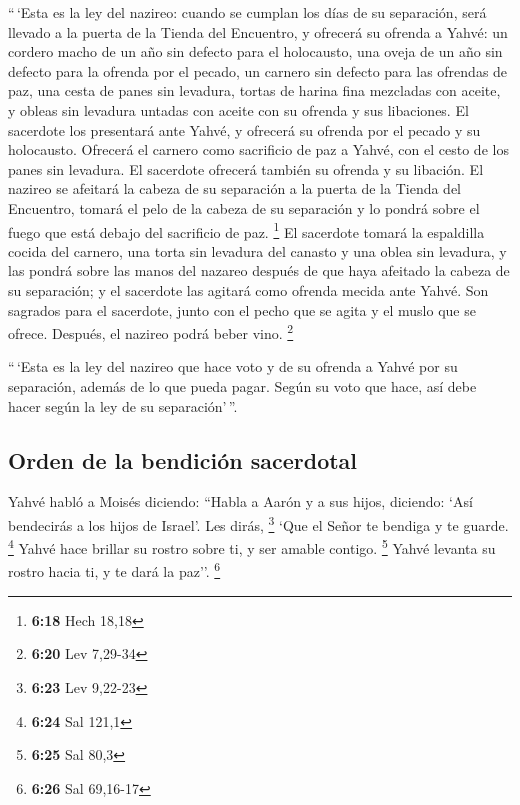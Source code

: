 \begin{paracol}{2}
 ``\,`Esta es la ley del nazireo: cuando se cumplan los
días de su separación, será llevado a la puerta de la Tienda del
Encuentro,  y ofrecerá su ofrenda a Yahvé: un cordero
macho de un año sin defecto para el holocausto, una oveja de un año sin
defecto para la ofrenda por el pecado, un carnero sin defecto para las
ofrendas de paz,  una cesta de panes sin levadura, tortas
de harina fina mezcladas con aceite, y obleas sin levadura untadas con
aceite con su ofrenda y sus libaciones.  El sacerdote los
presentará ante Yahvé, y ofrecerá su ofrenda por el pecado y su
holocausto.  Ofrecerá el carnero como sacrificio de paz a
Yahvé, con el cesto de los panes sin levadura. El sacerdote ofrecerá
también su ofrenda y su libación.  El nazireo se afeitará
la cabeza de su separación a la puerta de la Tienda del Encuentro,
tomará el pelo de la cabeza de su separación y lo pondrá sobre el fuego
que está debajo del sacrificio de paz. \footnote{\textbf{6:18} Hech
  18,18}  El sacerdote tomará la espaldilla cocida del
carnero, una torta sin levadura del canasto y una oblea sin levadura, y
las pondrá sobre las manos del nazareo después de que haya afeitado la
cabeza de su separación;  y el sacerdote las agitará como
ofrenda mecida ante Yahvé. Son sagrados para el sacerdote, junto con el
pecho que se agita y el muslo que se ofrece. Después, el nazireo podrá
beber vino. \footnote{\textbf{6:20} Lev 7,29-34}

 ``\,`Esta es la ley del nazireo que hace voto y de su
ofrenda a Yahvé por su separación, además de lo que pueda pagar. Según
su voto que hace, así debe hacer según la ley de su separación'\,''.

\hypertarget{orden-de-la-bendiciuxf3n-sacerdotal}{%
\subsection{Orden de la bendición
sacerdotal}\label{orden-de-la-bendiciuxf3n-sacerdotal}}

 Yahvé habló a Moisés diciendo:  ``Habla a
Aarón y a sus hijos, diciendo: `Así bendecirás a los hijos de Israel'.
Les dirás, \footnote{\textbf{6:23} Lev 9,22-23}  `Que el
Señor te bendiga y te guarde. \footnote{\textbf{6:24} Sal 121,1}
 Yahvé hace brillar su rostro sobre ti, y ser amable
contigo. \footnote{\textbf{6:25} Sal 80,3}  Yahvé levanta
su rostro hacia ti, y te dará la paz''. \footnote{\textbf{6:26} Sal
  69,16-17}


\end{paracol}
